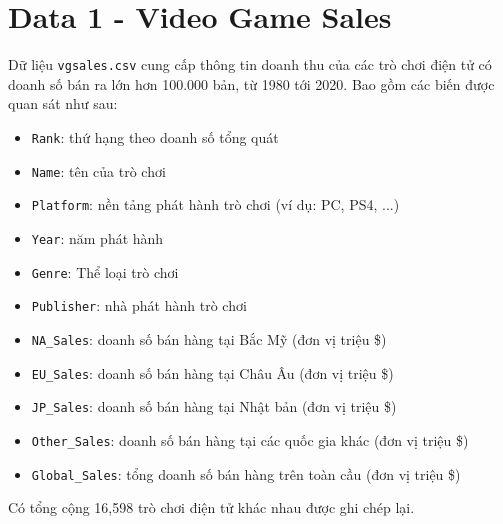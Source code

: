 \documentclass[12pt]{article}
\theoremstyle{definition} \newtheorem{exercise}[theorem]{\bf Bài tập}
\begin{document}
\section*{Data 1 - Video Game Sales}
Dữ liệu \texttt{vgsales.csv} cung cấp thông tin doanh thu của các trò chơi điện tử có doanh số bán ra lớn hơn 100.000 bản, từ 1980 tới 2020. Bao gồm các biến được quan sát như sau:
\begin{itemize}
\item \texttt{Rank}: thứ hạng theo doanh số tổng quát
\item \texttt{Name}: tên của trò chơi
\item \texttt{Platform}: nền tảng phát hành trò chơi (ví dụ: PC, PS4, ...)
\item \texttt{Year}: năm phát hành
\item \texttt{Genre}: Thể loại trò chơi
\item \texttt{Publisher}: nhà phát hành trò chơi
\item \texttt{NA\_Sales}: doanh số bán hàng tại Bắc Mỹ (đơn vị triệu \$)
\item \texttt{EU\_Sales}: doanh số bán hàng tại Châu Âu (đơn vị triệu \$)
\item \texttt{JP\_Sales}: doanh số bán hàng tại Nhật bản (đơn vị triệu \$)
\item \texttt{Other\_Sales}: doanh số bán hàng tại các quốc gia khác (đơn vị triệu \$)
\item \texttt{Global\_Sales}: tổng doanh số bán hàng trên toàn cầu (đơn vị triệu \$)
\end{itemize}
Có tổng cộng 16,598 trò chơi điện tử khác nhau được ghi chép lại.
\end{document}
